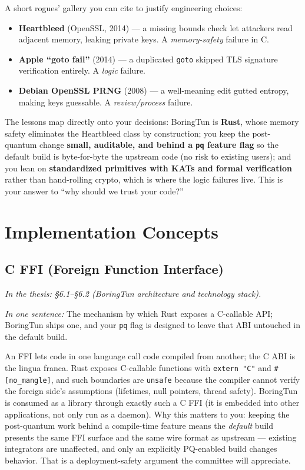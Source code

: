 \documentclass[11pt]{article}
\newcommand{\seethesis}[1]{%
  {\small\color{softgray}\textit{In the thesis: #1}}\par\vspace{3pt}}
\newcommand{\nutshell}[1]{\noindent\textit{In one sentence:} #1\par\vspace{4pt}}
\begin{document}
A short rogues' gallery you can cite to justify engineering choices:
\begin{itemize}
  \item \textbf{Heartbleed} (OpenSSL, 2014) --- a missing bounds check let
  attackers read adjacent memory, leaking private keys. A \emph{memory-safety}
  failure in C.
  \item \textbf{Apple ``goto fail''} (2014) --- a duplicated \texttt{goto}
  skipped TLS signature verification entirely. A \emph{logic} failure.
  \item \textbf{Debian OpenSSL PRNG} (2008) --- a well-meaning edit gutted
  entropy, making keys guessable. A \emph{review/process} failure.
\end{itemize}
The lessons map directly onto your decisions: BoringTun is \textbf{Rust}, whose
memory safety eliminates the Heartbleed class by construction; you keep the
post-quantum change \textbf{small, auditable, and behind a \texttt{pq} feature
flag} so the default build is byte-for-byte the upstream code (no risk to existing
users); and you lean on \textbf{standardized primitives with KATs and formal
verification} rather than hand-rolling crypto, which is where the logic failures
live. This is your answer to ``why should we trust your code?''

\section{Implementation Concepts}

\subsection{C FFI (Foreign Function Interface)}
\seethesis{\S6.1--\S6.2 (BoringTun architecture and technology stack).}
\nutshell{The mechanism by which Rust exposes a C-callable API; BoringTun ships
one, and your \texttt{pq} flag is designed to leave that ABI untouched in the
default build.}

An FFI lets code in one language call code compiled from another; the C ABI is
the lingua franca. Rust exposes C-callable functions with \texttt{extern "C"} and
\texttt{\#[no\_mangle]}, and such boundaries are \texttt{unsafe} because the
compiler cannot verify the foreign side's assumptions (lifetimes, null pointers,
thread safety). BoringTun is consumed as a library through exactly such a C FFI
(it is embedded into other applications, not only run as a daemon). Why this
matters to you: keeping the post-quantum work behind a compile-time feature means
the \emph{default} build presents the same FFI surface and the same wire format
as upstream --- existing integrators are unaffected, and only an explicitly
PQ-enabled build changes behavior. That is a deployment-safety argument the
committee will appreciate.
\end{document}
